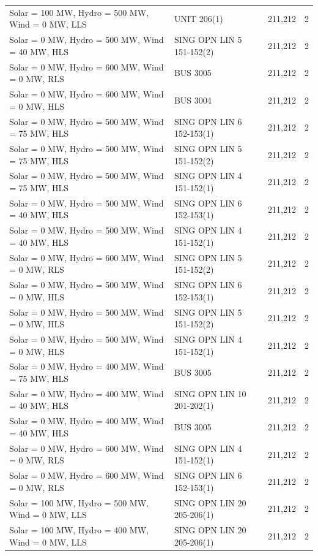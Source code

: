 \documentclass[10pt]{report}
\begin{document}
\begin{table}[H]
{\begin{tabular}{lllr}
Solar = 100 MW, Hydro = 500 MW, Wind = 0 MW, LLS & UNIT 206(1) & 211,212 & 2 \\
Solar = 0 MW, Hydro = 500 MW, Wind = 40 MW, HLS & SING OPN LIN   5 151-152(2) & 211,212 & 2 \\
Solar = 0 MW, Hydro = 600 MW, Wind = 0 MW, RLS & BUS 3005 & 211,212 & 2 \\
Solar = 0 MW, Hydro = 600 MW, Wind = 0 MW, HLS & BUS 3004 & 211,212 & 2 \\
Solar = 0 MW, Hydro = 500 MW, Wind = 75 MW, HLS & SING OPN LIN   6 152-153(1) & 211,212 & 2 \\
Solar = 0 MW, Hydro = 500 MW, Wind = 75 MW, HLS & SING OPN LIN   5 151-152(2) & 211,212 & 2 \\
Solar = 0 MW, Hydro = 500 MW, Wind = 75 MW, HLS & SING OPN LIN   4 151-152(1) & 211,212 & 2 \\
Solar = 0 MW, Hydro = 500 MW, Wind = 40 MW, HLS & SING OPN LIN   6 152-153(1) & 211,212 & 2 \\
Solar = 0 MW, Hydro = 500 MW, Wind = 40 MW, HLS & SING OPN LIN   4 151-152(1) & 211,212 & 2 \\
Solar = 0 MW, Hydro = 600 MW, Wind = 0 MW, RLS & SING OPN LIN   5 151-152(2) & 211,212 & 2 \\
Solar = 0 MW, Hydro = 500 MW, Wind = 0 MW, HLS & SING OPN LIN   6 152-153(1) & 211,212 & 2 \\
Solar = 0 MW, Hydro = 500 MW, Wind = 0 MW, HLS & SING OPN LIN   5 151-152(2) & 211,212 & 2 \\
Solar = 0 MW, Hydro = 500 MW, Wind = 0 MW, HLS & SING OPN LIN   4 151-152(1) & 211,212 & 2 \\
Solar = 0 MW, Hydro = 400 MW, Wind = 75 MW, HLS & BUS 3005 & 211,212 & 2 \\
Solar = 0 MW, Hydro = 400 MW, Wind = 40 MW, HLS & SING OPN LIN   10 201-202(1) & 211,212 & 2 \\
Solar = 0 MW, Hydro = 400 MW, Wind = 40 MW, HLS & BUS 3005 & 211,212 & 2 \\
Solar = 0 MW, Hydro = 600 MW, Wind = 0 MW, RLS & SING OPN LIN   4 151-152(1) & 211,212 & 2 \\
Solar = 0 MW, Hydro = 600 MW, Wind = 0 MW, RLS & SING OPN LIN   6 152-153(1) & 211,212 & 2 \\
Solar = 100 MW, Hydro = 500 MW, Wind = 0 MW, LLS & SING OPN LIN   20 205-206(1) & 211,212 & 2 \\
Solar = 100 MW, Hydro = 400 MW, Wind = 0 MW, LLS & SING OPN LIN   20 205-206(1) & 211,212 & 2 \\

\end{tabular}}
\end{table}
\end{document}
